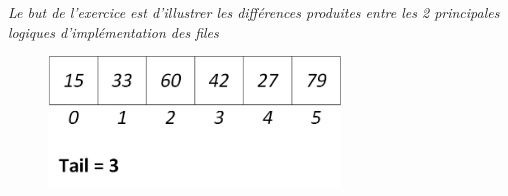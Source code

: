 \documentclass[11pt,a4paper]{article}
\begin{document}
\begin{center}
\textit{Le but de l'exercice est d'illustrer les différences produites entre les 2 principales logiques d'implémentation des files}
\end{center}


\begin{figure}[ht!]
\centering
\centerline{  %
\includegraphics[height=3.5cm]{img/file_t_1_B.png}
}
\end{figure}

\end{document}
